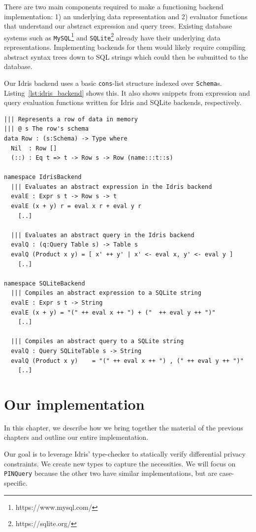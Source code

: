 \documentclass[12pt]{report}
\begin{document}
There are two main components required to make a functioning backend implementation:
1) an underlying data representation and
2) evaluator functions that understand our abstract expression and query trees.
Existing database systems such as \texttt{MySQL}\footnote{https://www.mysql.com/} and \texttt{SQLite}\footnote{https://sqlite.org/} already have their underlying data representations.
Implementing backends for them would likely require compiling abstract syntax trees down to SQL strings which could then be submitted to the database.

Our Idris backend uses a basic \texttt{cons}-list structure indexed over \texttt{Schema}s.
Listing~\ref{lst:idris_backend} shows this.
It also shows snippets from expression and query evaluation functions written for Idris and SQLite backends, respectively.

\begin{lstlisting}[caption={Implementing backends (snippets)},label={lst:idris_backend}]
||| Represents a row of data in memory
||| @ s The row's schema
data Row : (s:Schema) -> Type where
  Nil  : Row []
  (::) : Eq t => t -> Row s -> Row (name:::t::s)

namespace IdrisBackend
  ||| Evaluates an abstract expression in the Idris backend
  evalE : Expr s t -> Row s -> t
  evalE (x + y) r = eval x r + eval y r
    [..]

  ||| Evaluates an abstract query in the Idris backend
  evalQ : (q:Query Table s) -> Table s
  evalQ (Product x y) = [ x' ++ y' | x' <- eval x, y' <- eval y ]
    [..]

namespace SQLiteBackend
  ||| Compiles an abstract expression to a SQLite string
  evalE : Expr s t -> String
  evalE (x + y) = "(" ++ eval x ++ ") + ("  ++ eval y ++ ")"
    [..]

  ||| Compiles an abstract query to a SQLite string
  evalQ : Query SQLiteTable s -> String
  evalQ (Product x y)    = "(" ++ eval x ++ ") , (" ++ eval y ++ ")"
    [..]
\end{lstlisting}

\chapter{Our implementation}\label{sec:our_implementation}

In this chapter, we describe how we bring together the material of the previous chapters and outline our entire implementation.

Our goal is to leverage Idris' type-checker to statically verify differential privacy constraints.
We create new types to capture the necessities.
We will focus on \texttt{PINQuery} because the other two have similar implementations, but are case-specific.
\end{document}
